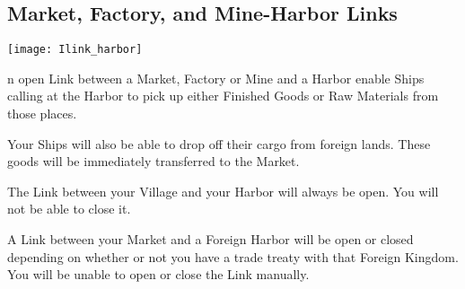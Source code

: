 \clearpage

\subsection{\textsf{Market, Factory, and Mine-Harbor Links}}


\begin{center}
    \texttt{[image: Ilink\_harbor]} %
\end{center}

n open Link between a Market, Factory or Mine and a Harbor enable Ships calling at the Harbor to pick up either Finished Goods or Raw Materials from those places.

Your Ships will also be able to drop off their cargo from foreign lands. These goods will be immediately transferred to the Market.

The Link between your Village and your Harbor will always be open. You will not be able to close it.

A Link between your Market and a Foreign Harbor will be open or closed depending on whether or not you have a trade treaty with that Foreign Kingdom. You will be unable to open or close the Link manually.